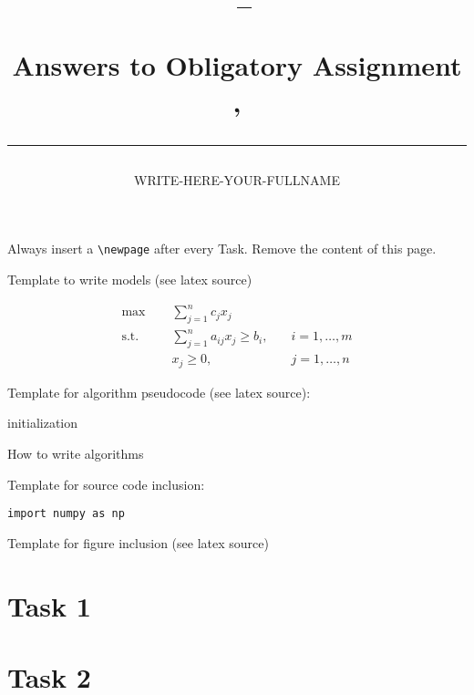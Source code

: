 \documentclass[a4paper,11pt]{article}
\author{WRITE-HERE-YOUR-FULLNAME}
\title{\begin{flushleft}
\vspace{-4ex}
\courseid~-- \coursename \\[0.2cm]
{\Large Answers to Obligatory Assignment \assnr, \term \\[3ex]
\hrule}
\end{flushleft}
}
\date{}
\begin{document}
\maketitle
\setlength{\headheight}{26pt}


Always insert a \verb=\newpage= after every Task.
Remove the content of this page.

\bigskip
\bigskip

Template to write models (see latex source)

\begin{align}
   \label{ob} \max \; \quad & \sum_{j=1}^nc_jx_j  \\
   \label{c1} \mbox{s.t.} \quad &\sum\limits_{j=1}^n a_{ij}x_j\geq b_i,
   & \quad i=1,\ldots,m \\
\label{c2}   &x_j \geq 0, & \quad j=1,\ldots,n   
\end{align}

Template for algorithm pseudocode (see latex source):

\begin{algorithm}[htb]
 initialization\;
 \caption{How to write algorithms}
\end{algorithm}


\bigskip
\bigskip
Template for source code inclusion:

\begin{lstlisting}
import numpy as np

\end{lstlisting}

Template for figure inclusion (see latex source)

\begin{figure}[htb]
\begin{center}
\end{center}
\end{figure}





\newpage
\section{Task 1}




\newpage
\section{Task 2}
\end{document}
